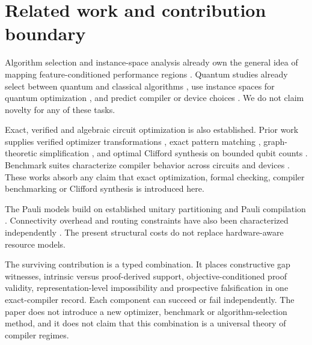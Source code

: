 \section{Related work and contribution boundary}

Algorithm selection and instance-space analysis already own the general idea of mapping feature-conditioned performance regions \cite{rice1976algorithm,smithmiles2009meta,smithmiles2023isa}.  Quantum studies already select between quantum and classical algorithms \cite{moussa2020selection}, use instance spaces for quantum optimization \cite{katial2025qaoa}, and predict compiler or device choices \cite{quetschlich2023options,quetschlich2025predictor}.  We do not claim novelty for any of these tasks.

Exact, verified and algebraic circuit optimization is also established.  Prior work supplies verified optimizer transformations \cite{hietala2021verified}, exact pattern matching \cite{iten2022patterns}, graph-theoretic simplification \cite{duncan2020zx}, and optimal Clifford synthesis on bounded qubit counts \cite{bravyi2022clifford}.  Benchmark suites characterize compiler behavior across circuits and devices \cite{li2023qasmbench,quetschlich2023mqtbench}.  These works absorb any claim that exact optimization, formal checking, compiler benchmarking or Clifford synthesis is introduced here.

The Pauli models build on established unitary partitioning and Pauli compilation \cite{izmaylov2020unitary,peres2023pbc,vandenberg2020diagonalization,paykin2023pcoast}.  Connectivity overhead and routing constraints have also been characterized independently \cite{yuan2025connectivity}.  The present structural costs do not replace hardware-aware resource models.

The surviving contribution is a typed combination.  It places constructive gap witnesses, intrinsic versus proof-derived support, objective-conditioned proof validity, representation-level impossibility and prospective falsification in one exact-compiler record.  Each component can succeed or fail independently.  The paper does not introduce a new optimizer, benchmark or algorithm-selection method, and it does not claim that this combination is a universal theory of compiler regimes.
